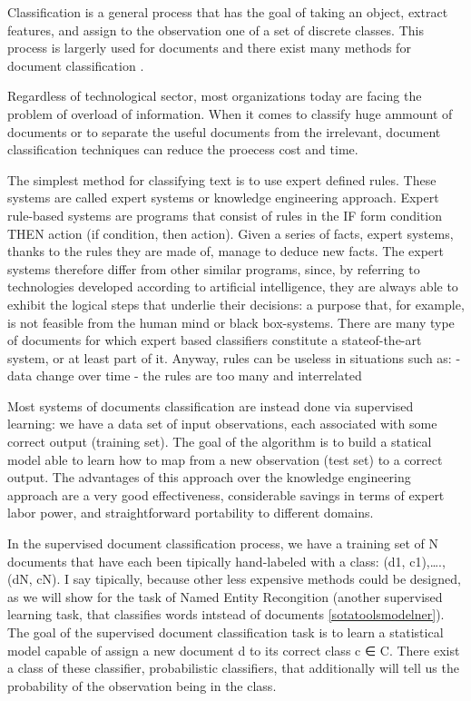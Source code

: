 \documentclass[]{book}
\begin{document}
Classification is a general process that has the goal of taking an
object, extract features, and assign to the observation one of a set of
discrete classes. This process is largerly used for documents
\citep{borko1963automatic} and there exist many methods for document
classification \citep{aggarwal2012survey}.

Regardless of technological sector, most organizations today are facing
the problem of overload of information. When it comes to classify huge
ammount of documents or to separate the useful documents from the
irrelevant, document classification techniques can reduce the proecess
cost and time.

The simplest method for classifying text is to use expert defined rules.
These systems are called expert systems or knowledge engineering
approach. Expert rule-based systems are programs that consist of rules
in the IF form condition THEN action (if condition, then action). Given
a series of facts, expert systems, thanks to the rules they are made of,
manage to deduce new facts. The expert systems therefore differ from
other similar programs, since, by referring to technologies developed
according to artificial intelligence, they are always able to exhibit
the logical steps that underlie their decisions: a purpose that, for
example, is not feasible from the human mind or black box-systems. There
are many type of documents for which expert based classifiers constitute
a stateof-the-art system, or at least part of it. Anyway, rules can be
useless in situations such as: - data change over time - the rules are
too many and interrelated

Most systems of documents classification are instead done via supervised
learning: we have a data set of input observations, each associated with
some correct output (training set). The goal of the algorithm is to
build a statical model able to learn how to map from a new observation
(test set) to a correct output. The advantages of this approach over the
knowledge engineering approach are a very good effectiveness,
considerable savings in terms of expert labor power, and straightforward
portability to different domains.

In the supervised document classification process, we have a training
set of N documents that have each been tipically hand-labeled with a
class: (d1, c1),\ldots{}.,(dN, cN). I say tipically, because other less
expensive methods could be designed, as we will show for the task of
Named Entity Recongition (another supervised learning task, that
classifies words intstead of documents \ref{sotatoolsmodelner}). The
goal of the supervised document classification task is to learn a
statistical model capable of assign a new document d to its correct
class c ∈ C. There exist a class of these classifier, probabilistic
classifiers, that additionally will tell us the probability of the
observation being in the class.
\end{document}
